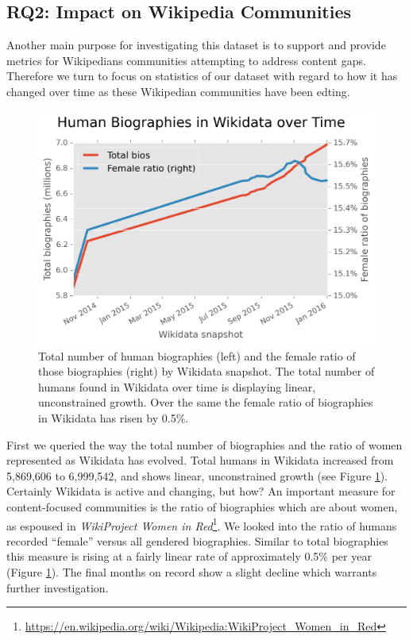 \documentclass{sig-alternate-05-2015}
\begin{document}
\subsection{RQ2: Impact on Wikipedia Communities}
Another main purpose for investigating this dataset is to support and provide metrics for Wikipedians communities attempting to  address content gaps. Therefore we turn to focus on statistics of our dataset with regard to how it has changed over time as these Wiki\-pedian communities have been edting. 

\begin{figure}
\includegraphics[width=\columnwidth]{figures/totalfrb.png} 
\caption{Total number of human biographies (left) and the female ratio of those biographies (right) by Wikidata snapshot. The total number of humans found in Wikidata over time is displaying linear, unconstrained growth. Over the same  the female ratio of biographies in Wikidata has risen by 0.5\%.}
\label{fig:totalfrb}
\end{figure}

First we queried the way the total number of biographies and the ratio of women represented as Wikidata has evolved. Total humans in Wikidata increased from 5,869,606 to 6,999,542, and shows linear, unconstrained growth (see Figure \ref{fig:totalfrb}). Certainly Wikidata is active and changing, but how? An important measure for content-focused communities is the ratio of biographies which are about women, as espoused in \textit{WikiProject Women in Red}\footnote{\url{https://en.wikipedia.org/wiki/Wikipedia:WikiProject_Women_in_Red}}. We looked into the ratio of  humans recorded ``female'' versus all gendered biographies. Similar to total biographies this measure is rising at a fairly linear rate of approximately 0.5\% per year (Figure \ref{fig:totalfrb}). The final months on record show a slight decline which warrants further investigation. 
\end{document}

